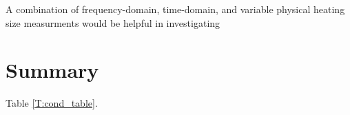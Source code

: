 \documentclass[aps,prb,twocolumn,superscriptaddress,footinbib,amsmath,amssymb,floatfix]{revtex4}
\begin{document}
A combination of frequency-domain, time-domain, and variable 
physical heating size measurments would be helpful in investigating
\cite{koh_frequency_2007,siemens_quasi-ballistic_2010,
minnich_thermal_2011,regner_broadband_2013}


\section{\label{S:Lifetimes}Summary}

Table \ref{T:cond_table}.

\end{document}
